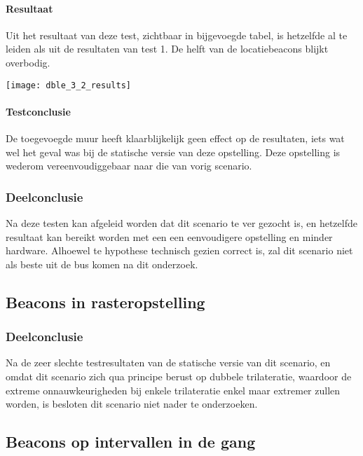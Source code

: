 \paragraph{Resultaat}
\begin{minipage}{0.42\textwidth}
Uit het resultaat van deze test, zichtbaar in bijgevoegde tabel, is hetzelfde al te leiden als uit de resultaten van test 1. De helft van de locatiebeacons blijkt overbodig.
\end{minipage}
\hfill
\begin{minipage}{0.55\textwidth}
	\texttt{[image: dble\_3\_2\_results]}
	\label{fig:ond-ble-dynamic-3-2-res}
\end{minipage}

\paragraph{Testconclusie}
De toegevoegde muur heeft klaarblijkelijk geen effect op de resultaten, iets wat wel het geval was bij de statische versie van deze opstelling. Deze opstelling is wederom vereenvoudiggebaar naar die van vorig scenario.

\subsubsection{Deelconclusie}
Na deze testen kan afgeleid worden dat dit scenario te ver gezocht is, en hetzelfde resultaat kan bereikt worden met een een eenvoudigere opstelling en minder hardware. Alhoewel te hypothese technisch gezien correct is, zal dit scenario niet als beste uit de bus komen na dit onderzoek.

\subsection{Beacons in rasteropstelling}
\subsubsection{Deelconclusie}
Na de zeer slechte testresultaten van de statische versie van dit scenario, en omdat dit scenario zich qua principe berust op dubbele trilateratie, waardoor de extreme onnauwkeurigheden bij enkele trilateratie enkel maar extremer zullen worden, is besloten dit scenario niet nader te onderzoeken.

\subsection{Beacons op intervallen in de gang}
